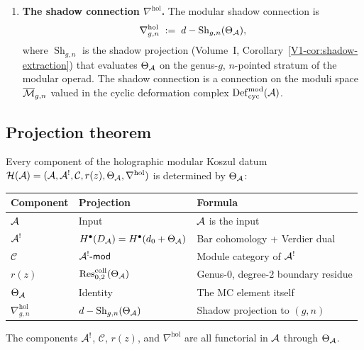 \begin{enumerate}[label=\textbf{Component (\alph*):}, leftmargin=4.5em, itemsep=1.5ex]
\item \textbf{The shadow connection $\nabla^{\mathrm{hol}}$.}
The modular shadow connection is
\begin{equation}%
\nabla^{\mathrm{hol}}_{g,n}
\;:=\; d - \operatorname{Sh}_{g,n}(\Theta_\cA),
\end{equation}
where $\operatorname{Sh}_{g,n}$ is the shadow projection
(Volume~I, Corollary~\ref*{V1-cor:shadow-extraction}) that evaluates
$\Theta_{\mathcal{A}}$ on the genus-$g$, $n$-pointed stratum of the
modular operad. The shadow connection is a connection on the
moduli space $\overline{\mathcal M}_{g,n}$ valued in the cyclic deformation
complex $\mathrm{Def}_{\mathrm{cyc}}^{\mathrm{mod}}(\mathcal{A})$.

\end{enumerate}


\subsection{Projection theorem}

\begin{theorem}
Every component of the holographic modular Koszul datum
$\mathcal{H}(\mathcal{A}) = (\mathcal{A}, \mathcal{A}^!, \mathcal{C}, r(z),
\Theta_{\mathcal{A}}, \nabla^{\mathrm{hol}})$ is determined by $\Theta_{\mathcal{A}}$:
\begin{center}
\renewcommand{\arraystretch}{1.4}
\small
\begin{tabular}{lll}
\textbf{Component} & \textbf{Projection} & \textbf{Formula} \\
\hline
$\mathcal{A}$ & Input & $\mathcal{A}$ is the input \\[2pt]
$\mathcal{A}^!$ & $H^\bullet(D_{\mathcal{A}}) = H^\bullet(d_0 + \Theta_{\mathcal{A}})$
 & Bar cohomology + Verdier dual \\[2pt]
$\mathcal{C}$ & $\mathcal{A}^!\text{-}\mathsf{mod}$
 & Module category of $\mathcal{A}^!$ \\[2pt]
$r(z)$ & $\operatorname{Res}^{\mathrm{coll}}_{0,2}(\Theta_{\mathcal{A}})$
 & Genus-$0$, degree-$2$ boundary residue \\[2pt]
$\Theta_{\mathcal{A}}$ & Identity & The MC element itself \\[2pt]
$\nabla^{\mathrm{hol}}_{g,n}$
 & $d - \operatorname{Sh}_{g,n}(\Theta_{\mathcal{A}})$
 & Shadow projection to $(g,n)$
\end{tabular}
\end{center}
The components $\mathcal{A}^!$, $\mathcal{C}$, $r(z)$, and
$\nabla^{\mathrm{hol}}$ are all functorial in $\mathcal{A}$ through
$\Theta_{\mathcal{A}}$.
\end{theorem}

